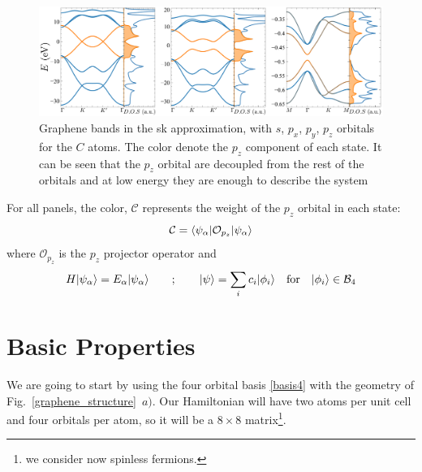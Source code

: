 \begin{figure}[h!]
\centering
\includegraphics{graphene/figures/banddos.pdf}
\vspace{-15pt}
\caption{Graphene bands in the \ac{sk} approximation, with $s$, $p_x$, $p_y$, $p_z$ orbitals for the $C$ atoms. The color denote the $p_z$ component of each state. It can be seen that the $p_z$ orbital are decoupled from the rest of the orbitals and at low energy they are enough to describe the system}
\label{SKbands}
\end{figure}
\FloatBarrier
For all panels, the color, $\mathcal{C}$ represents the weight of the $p_z$ orbital in each state:
\begin{equation*}
   \mathcal{C} = \langle\psi_{\alpha}|\mathcal{O}_{p_z}|\psi_{\alpha}\rangle
\end{equation*}
where $\mathcal{O}_{p_z}$ is the $p_z$ projector operator and
\begin{equation*}
  H|\psi_{\alpha}\rangle = E_{\alpha}|\psi_{\alpha}\rangle \qquad ; \qquad
   |\psi\rangle = \sum_i c_i|\phi_i\rangle \quad
   \text{for} \quad|\phi_i\rangle\in\mathcal{B}_4
\end{equation*}

\section{Basic Properties}
\label{sec:graphene_basic_properties}
We are going to start by using the four orbital basis \eqref{basis4} with the geometry of Fig.~\ref{graphene_structure}~$a)$. Our Hamiltonian will have two atoms per unit cell and four orbitals per atom, so it will be a $8\times8$ matrix\footnote{we consider now spinless fermions.}.

